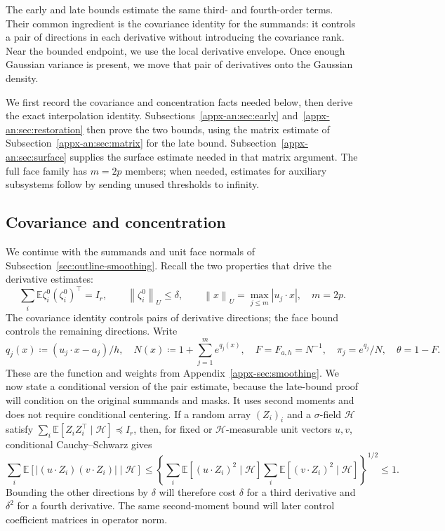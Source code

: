 \documentclass[11pt,letterpaper]{article}
\theoremstyle{remark}
\newcommand{\E}{\mathbb E}
\newcommand{\norm}[1]{\left\lVert#1\right\rVert}
\begin{document}
The early and late bounds estimate the same third- and fourth-order
terms. Their common ingredient is the covariance identity for the
summands: it controls a pair of directions in each derivative without
introducing the covariance rank. Near the bounded endpoint, we use
the local derivative envelope. Once enough Gaussian variance is
present, we move that pair of derivatives onto the Gaussian density.

We first record the covariance and concentration facts needed below,
then derive the exact interpolation identity. Subsections~\ref{appx-an:sec:early}
and~\ref{appx-an:sec:restoration} then prove the two bounds, using
the matrix estimate of Subsection~\ref{appx-an:sec:matrix} for the
late bound. Subsection~\ref{appx-an:sec:surface} supplies the surface
estimate needed in that matrix argument. The full face family has
\(m=2p\) members; when needed, estimates for auxiliary subsystems
follow by sending unused thresholds to infinity.

\subsection{Covariance and concentration}
\label{appx-an:sec:coords}

We continue with the summands and unit face normals of
Subsection~\ref{sec:outline-smoothing}. Recall the two properties
that drive the derivative estimates:
\begin{equation}
 \sum_i\E\zeta_i^0(\zeta_i^0)^\top=I_r,
 \qquad \norm{\zeta_i^0}_U\le\delta,
 \qquad \norm x_U=\max_{j\le m}|u_j\cdot x|,
 \quad m=2p.
 \label{appx-eq:projected-bound}
\end{equation}
The covariance identity controls pairs of derivative directions;
the face bound controls the remaining directions. Write
\[
 q_j(x)\coloneqq(u_j\cdot x-a_j)/h,\quad
 N(x)\coloneqq1+\sum_{j=1}^m e^{q_j(x)},\quad
 F=F_{a,h}=N^{-1},\quad\pi_j=e^{q_j}/N,\quad\theta=1-F.
\]
These are the function and weights from Appendix~\ref{appx-sec:smoothing}.
We now state a conditional version of the pair estimate, because
the late-bound proof will condition on the original summands and masks.
It uses second moments and does not require conditional centering. If a random array \((Z_i)_i\)
and a \(\sigma\)-field \(\mathcal H\) satisfy
\(\sum_i\E[Z_iZ_i^\top\mid\mathcal H]\preceq I_r\), then, for
fixed or \(\mathcal H\)-measurable unit vectors \(u,v\),
conditional Cauchy--Schwarz gives
\begin{equation}
 \sum_i\E[|(u\cdot Z_i)(v\cdot Z_i)|\mid\mathcal H]
 \le\left\{\sum_i\E[(u\cdot Z_i)^2\mid\mathcal H]
           \sum_i\E[(v\cdot Z_i)^2\mid\mathcal H]\right\}^{1/2}
 \le1.
 \label{appx-an:pair-contraction}
\end{equation}
Bounding the other directions by \(\delta\) will therefore cost
\(\delta\) for a third derivative and \(\delta^2\) for a fourth
derivative. The same second-moment bound will later control coefficient
matrices in operator norm.
\end{document}

